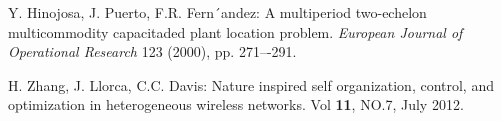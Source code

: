 \documentclass[11pt]{article}
\numberwithin{equation}{section}
\begin{document}
\begin{thebibliography}{99}
  Y. Hinojosa, J. Puerto, F.R. Fern´andez: A multiperiod two-echelon multicommodity capacitaded plant location problem. \textit{European Journal of Operational Research} 123 (2000), pp. 271–-291.

  H. Zhang, J. Llorca, C.C. Davis: Nature inspired self organization, control, and optimization in heterogeneous wireless networks.  Vol \textbf{11}, NO.7, July 2012.\\












\end{thebibliography}
\end{document}
